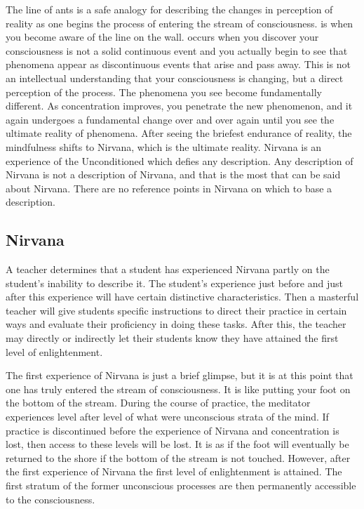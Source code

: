 \documentclass[a5paper,10pt,english]{book}
\begin{document}
\sphinxAtStartPar
The line of ants is a safe analogy for describing the changes in
perception of reality as one begins the process of entering the stream
of consciousness.  is when you become aware of the line on
the wall.  occurs when you discover your consciousness
is not a solid continuous event and you actually begin to see that
phenomena appear as discontinuous events that arise and pass away. This
is not an intellectual understanding that your consciousness is
changing, but a direct perception of the process. The phenomena you see
become fundamentally different. As concentration improves, you penetrate
the new phenomenon, and it again undergoes a fundamental change over and
over again until you see the ultimate reality of phenomena. After seeing
the briefest endurance of reality, the mindfulness shifts to Nirvana,
which is the ultimate reality. Nirvana is an experience of the
Unconditioned which defies any description. Any description of Nirvana
is not a description of Nirvana, and that is the most that can be said
about Nirvana. There are no reference points in Nirvana on which to base
a description.


\subsection{Nirvana}
\label{\detokenize{saints:nirvana}}
\sphinxAtStartPar
A teacher determines that a student has experienced Nirvana partly on
the student’s inability to describe it. The student’s experience just
before and just after this experience will have certain distinctive
characteristics. Then a masterful teacher will give students specific
instructions to direct their practice in certain ways and evaluate their
proficiency in doing these tasks. After this, the teacher may directly
or indirectly let their students know they have attained the first level
of enlightenment.

\sphinxAtStartPar
The first experience of Nirvana is just a brief glimpse, but it is at
this point that one has truly entered the stream of consciousness. It is
like putting your foot on the bottom of the stream. During the course of
practice, the meditator experiences level after level of what were
unconscious strata of the mind. If practice is discontinued before the
experience of Nirvana and concentration is lost, then access to these
levels will be lost. It is as if the foot will eventually be returned to
the shore if the bottom of the stream is not touched. However, after the
first experience of Nirvana the first level of enlightenment is
attained. The first stratum of the former unconscious processes are then
permanently accessible to the consciousness.
\end{document}
